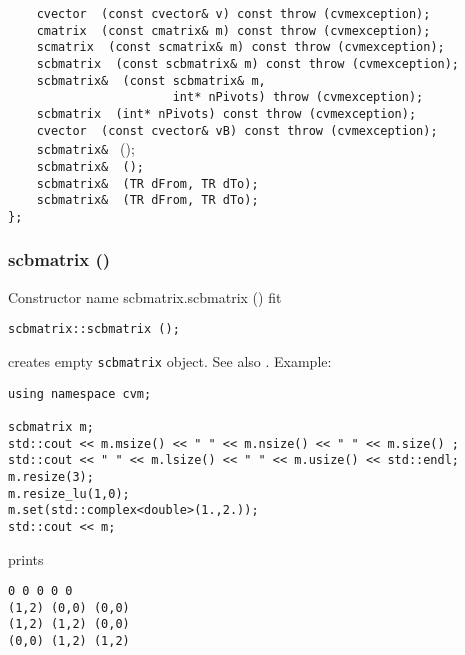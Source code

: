 \verb"    cvector "\verb" (const cvector& v) const throw (cvmexception);"\\
\verb"    cmatrix "\verb" (const cmatrix& m) const throw (cvmexception);"\\
\verb"    scmatrix "\verb" (const scmatrix& m) const throw (cvmexception);"\\
\verb"    scbmatrix "\verb" (const scbmatrix& m) const throw (cvmexception);"\\
\verb"    scbmatrix& "\verb" (const scbmatrix& m,"\\
\verb"                       int* nPivots) throw (cvmexception);"\\
\verb"    scbmatrix "\verb" (int* nPivots) const throw (cvmexception);"\\
\verb"    cvector "\verb" (const cvector& vB) const throw (cvmexception);"\\
\verb"    scbmatrix& " ();\\
\verb"    scbmatrix& "\verb" ();"\\
\verb"    scbmatrix& "\verb" (TR dFrom, TR dTo);"\\
\verb"    scbmatrix& "\verb" (TR dFrom, TR dTo);"\\
\verb"};"
\newpage



\subsubsection{scbmatrix ()}
Constructor%
\pdfdest name {scbmatrix.scbmatrix ()} fit
\begin{verbatim}
scbmatrix::scbmatrix ();
\end{verbatim}
creates  empty \verb"scbmatrix" object.
See also .
Example:
\begin{Verbatim}
using namespace cvm;

scbmatrix m;
std::cout << m.msize() << " " << m.nsize() << " " << m.size() ;
std::cout << " " << m.lsize() << " " << m.usize() << std::endl;
m.resize(3);
m.resize_lu(1,0);
m.set(std::complex<double>(1.,2.));
std::cout << m;
\end{Verbatim}
prints
\begin{Verbatim}
0 0 0 0 0
(1,2) (0,0) (0,0)
(1,2) (1,2) (0,0)
(0,0) (1,2) (1,2)
\end{Verbatim}
\newpage




